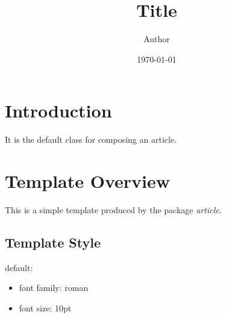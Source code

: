 \documentclass{article}
\title{Title}
\author{Author}
\date{\today}
\providecommand{\tightlist}{
\setlength{\itemsep}{0pt}\setlength{\parskip}{0pt}}
\begin{document}
\maketitle
\tableofcontents
\newpage
\section{Introduction}
{
It is the default class for composing an article.
}
\section{Template Overview}
{
This is a simple template produced by the package \textit{article}.
}
\subsection{Template Style}
{
default:

\begin{itemize}
\tightlist
\item
font family: roman
\item
font size: 10pt
\end{itemize}
}
\end{document}
